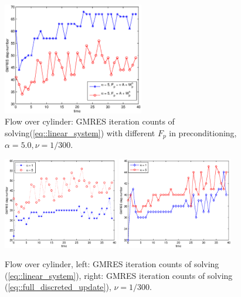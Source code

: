       \begin{figure}[!htbp]
        \begin{center}
          \includegraphics[width = 0.55\textwidth]{picture/second/obstacle_flow_data/comparation_NS_iterate_step.eps}
        \end{center}
        \caption{\small Flow over cylinder: GMRES iteration counts of
                 solving(\ref{eq::linear_system}) with different $F_p$ in
                 preconditioning, $\alpha = 5.0, \nu = 1/300$.}
        \label{fig::cylinder_GMRES_steps_comparation}
      \end{figure}

      \begin{figure}[!htbp]
        \begin{center}
          \includegraphics[width = 0.45\textwidth]{picture/second/obstacle_flow_data/NS_iterate_steps.eps}
          \includegraphics[width = 0.45\textwidth]{picture/second/obstacle_flow_data/moving_iterate_steps.eps}
        \end{center}
        \caption{\small Flow over cylinder, left: GMRES iteration counts of
          solving (\ref{eq::linear_system}), right: GMRES iteration
          counts of solving (\ref{eq::full_discreted_update}), $\nu =
          1/300$.}
        \label{fig::cylinder_GMRES_steps}
      \end{figure}


